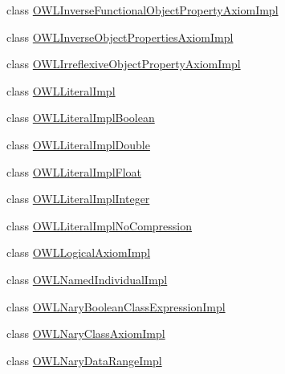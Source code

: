 \begin{DoxyCompactItemize}
\item 
class \hyperlink{classuk_1_1ac_1_1manchester_1_1cs_1_1owl_1_1owlapi_1_1_o_w_l_inverse_functional_object_property_axiom_impl}{O\-W\-L\-Inverse\-Functional\-Object\-Property\-Axiom\-Impl}
\item 
class \hyperlink{classuk_1_1ac_1_1manchester_1_1cs_1_1owl_1_1owlapi_1_1_o_w_l_inverse_object_properties_axiom_impl}{O\-W\-L\-Inverse\-Object\-Properties\-Axiom\-Impl}
\item 
class \hyperlink{classuk_1_1ac_1_1manchester_1_1cs_1_1owl_1_1owlapi_1_1_o_w_l_irreflexive_object_property_axiom_impl}{O\-W\-L\-Irreflexive\-Object\-Property\-Axiom\-Impl}
\item 
class \hyperlink{classuk_1_1ac_1_1manchester_1_1cs_1_1owl_1_1owlapi_1_1_o_w_l_literal_impl}{O\-W\-L\-Literal\-Impl}
\item 
class \hyperlink{classuk_1_1ac_1_1manchester_1_1cs_1_1owl_1_1owlapi_1_1_o_w_l_literal_impl_boolean}{O\-W\-L\-Literal\-Impl\-Boolean}
\item 
class \hyperlink{classuk_1_1ac_1_1manchester_1_1cs_1_1owl_1_1owlapi_1_1_o_w_l_literal_impl_double}{O\-W\-L\-Literal\-Impl\-Double}
\item 
class \hyperlink{classuk_1_1ac_1_1manchester_1_1cs_1_1owl_1_1owlapi_1_1_o_w_l_literal_impl_float}{O\-W\-L\-Literal\-Impl\-Float}
\item 
class \hyperlink{classuk_1_1ac_1_1manchester_1_1cs_1_1owl_1_1owlapi_1_1_o_w_l_literal_impl_integer}{O\-W\-L\-Literal\-Impl\-Integer}
\item 
class \hyperlink{classuk_1_1ac_1_1manchester_1_1cs_1_1owl_1_1owlapi_1_1_o_w_l_literal_impl_no_compression}{O\-W\-L\-Literal\-Impl\-No\-Compression}
\item 
class \hyperlink{classuk_1_1ac_1_1manchester_1_1cs_1_1owl_1_1owlapi_1_1_o_w_l_logical_axiom_impl}{O\-W\-L\-Logical\-Axiom\-Impl}
\item 
class \hyperlink{classuk_1_1ac_1_1manchester_1_1cs_1_1owl_1_1owlapi_1_1_o_w_l_named_individual_impl}{O\-W\-L\-Named\-Individual\-Impl}
\item 
class \hyperlink{classuk_1_1ac_1_1manchester_1_1cs_1_1owl_1_1owlapi_1_1_o_w_l_nary_boolean_class_expression_impl}{O\-W\-L\-Nary\-Boolean\-Class\-Expression\-Impl}
\item 
class \hyperlink{classuk_1_1ac_1_1manchester_1_1cs_1_1owl_1_1owlapi_1_1_o_w_l_nary_class_axiom_impl}{O\-W\-L\-Nary\-Class\-Axiom\-Impl}
\item 
class \hyperlink{classuk_1_1ac_1_1manchester_1_1cs_1_1owl_1_1owlapi_1_1_o_w_l_nary_data_range_impl}{O\-W\-L\-Nary\-Data\-Range\-Impl}

\end{DoxyCompactItemize}

